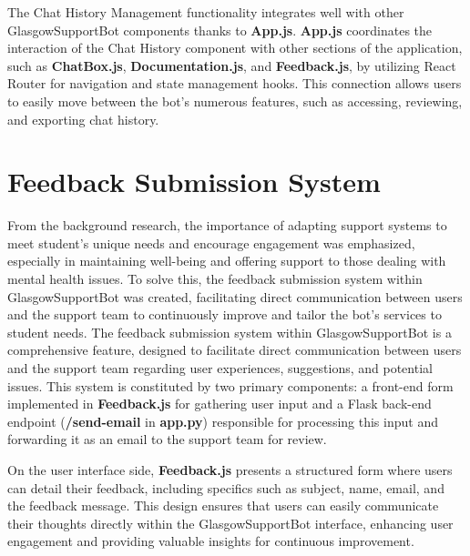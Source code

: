 \documentclass{l4proj}
\begin{document}
The Chat History Management functionality integrates well with other GlasgowSupportBot components thanks to \textbf{App.js}. \textbf{App.js} coordinates the interaction of the Chat History component with other sections of the application, such as \textbf{ChatBox.js}, \textbf{Documentation.js}, and \textbf{Feedback.js}, by utilizing React Router for navigation and state management hooks. This connection allows users to easily move between the bot's numerous features, such as accessing, reviewing, and exporting chat history. 

\section{Feedback Submission System}

From the background research, the importance of adapting support systems to meet student's unique needs and encourage engagement was emphasized, especially in maintaining well-being and offering support to those dealing with mental health issues. To solve this, the feedback submission system within GlasgowSupportBot was created, facilitating direct communication between users and the support team to continuously improve and tailor the bot’s services to student needs.
The feedback submission system within GlasgowSupportBot is a comprehensive feature, designed to facilitate direct communication between users and the support team regarding user experiences, suggestions, and potential issues. This system is constituted by two primary components: a front-end form implemented in \textbf{Feedback.js} for gathering user input and a Flask back-end endpoint (\textbf{/send-email} in \textbf{app.py}) responsible for processing this input and forwarding it as an email to the support team for review.

On the user interface side, \textbf{Feedback.js} presents a structured form where users can detail their feedback, including specifics such as subject, name, email, and the feedback message. This design ensures that users can easily communicate their thoughts directly within the GlasgowSupportBot interface, enhancing user engagement and providing valuable insights for continuous improvement.
\end{document}
